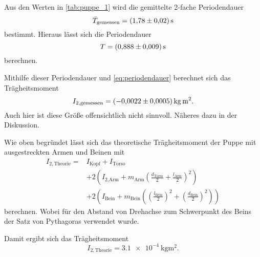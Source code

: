 Aus den Werten in \autoref{tab:puppe_1} wird die gemittelte 2-fache Periodendauer
\begin{equation}
    \bar{T}_\text{gemessen} = \SI{1.78+-0.02}{\second}
\end{equation}
bestimmt. Hieraus lässt sich die Periodendauer
\begin{equation}
    T = \SI{0.888+-0.009}{\second}
\end{equation}
berechnen.

Mithilfe dieser Periodendauer und \autoref{eq:periodendauer} berechnet sich das Trägheitsmoment
\begin{equation}
    I_{2,\text{gemessen}} = \SI{-0.0022+-0.0005}{\kilo\gram\meter\squared}.
\end{equation}
Auch hier ist diese Größe offensichtlich nicht sinnvoll. Näheres dazu in der Diskussion.

Wie oben begründet lässt sich das theoretische Trägheitsmoment der Puppe mit ausgestreckten Armen und Beinen mit
\begin{equation}
    \begin{split}
        I_{2,\text{Theorie}} = {} & I_\text{Kopf} + I_\text{Torso} \\
        & + 2 \left( I_\text{2,Arm} + m_\text{Arm} \left(\frac{d_\text{Torso}}{2} + \frac{l_\text{Arm}}{2} \right)^2 \right) \\
        & + 2 \left( I_\text{Bein} + m_\text{Bein} \left( \left(\frac{l_\text{Bein}}{2}\right)^2 + \left(\frac{d_\text{Bein}}{2}\right)^2 \right) \right)
    \end{split}
\end{equation}
berechnen. Wobei für den Abstand von Drehachse zum Schwerpunkt des Beins der Satz von Pythagoras verwendet wurde.

Damit ergibt sich das Trägheitsmoment
\begin{equation}
    I_{2,\text{Theorie}} = \SI{3.1e-4}{\kilo\gram\meter\squared}.
\end{equation}